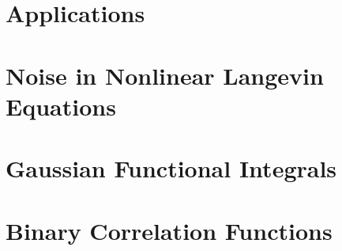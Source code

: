\documentclass[12pt, letterpaper]{report}
\begin{document}
\chapter{Applications}



\appendix

\chapter{Noise in Nonlinear Langevin Equations}
\label{noise}


\chapter{Gaussian Functional Integrals}


\chapter{Binary Correlation Functions}
\label{binary_correlations}




\end{document}
